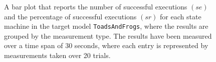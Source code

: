 \begin{figure}[h!]
\centering
\begin{minipage}{1\textwidth}
  \centering
  \makebox[\textwidth][c]{ %
        \resizebox{1.19\textwidth}{!}{ %
            
        }%
    }%
\end{minipage}
\caption{A bar plot that reports the number of successful executions $(se)$ and the percentage of successful executions $(sr)$ for each state machine in the target model \texttt{ToadsAndFrogs}, where the results are grouped by the measurement type. The results have been measured over a time span of 30 seconds, where each entry is represented by measurements taken over 20 trials.}
\label{figure:counting_logging_state_machine_transition_frequency_comparison_toadsandfrogs}
\end{figure}